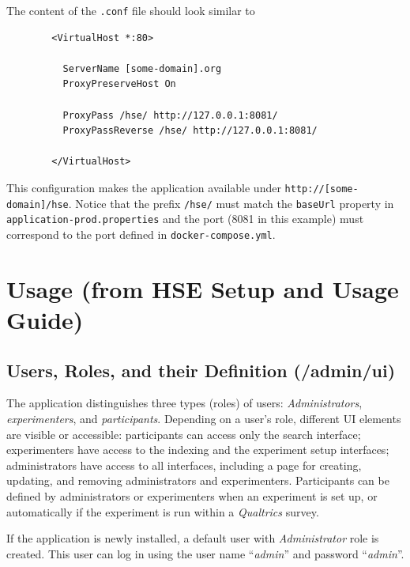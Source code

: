 \documentclass[a4paper]{usiinfbachelorproject}
\begin{document}
\begin{appendices}
        The content of the \texttt{.conf} file should look similar to

        \begin{verbatim}
        <VirtualHost *:80>

          ServerName [some-domain].org
          ProxyPreserveHost On

          ProxyPass /hse/ http://127.0.0.1:8081/
          ProxyPassReverse /hse/ http://127.0.0.1:8081/

        </VirtualHost>
        \end{verbatim}

        This configuration makes the application available under \texttt{http://[some-domain]/hse}. Notice that
        the prefix \texttt{/hse/} must match the \texttt{baseUrl} property in \texttt{application-prod.properties}
        and the port (8081 in this example) must correspond to the port defined in \texttt{docker-compose.yml}. 

        \section{Usage (from HSE Setup and Usage Guide)}
        \label{sec:usage}


        \subsection{Users, Roles, and their Definition \small{(/admin/ui)}}

        The application distinguishes three types (roles) of users: \emph{Administrators}, \emph{experimenters}, and \emph{participants}.
        Depending on a user's role, different UI elements are visible or accessible: participants can access only the search interface; 
        experimenters have access to the indexing and the experiment setup interfaces; administrators have access to all interfaces,
        including a page for creating, updating, and removing administrators and experimenters. Participants can be defined
        by administrators or experimenters when an experiment is set up, or automatically if the experiment is run within
        a \emph{Qualtrics} survey.

        If the application is newly installed, a default user with \emph{Administrator} role is created. This user can log in using
        the user name ``\emph{admin}'' and password ``\emph{admin}''.


\end{appendices}
\end{document}
